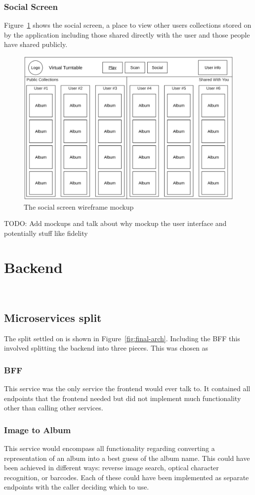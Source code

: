 \subsubsection{Social Screen}
Figure~\ref{fig:social_screen_mockup} shows the social screen, a place to view other users collections stored on by the application including those shared directly with the user and those people have shared publicly.
\begin{figure} [H]
    \centering
    \includegraphics[width=0.6\linewidth]{figures/social_screen_mockup.png}
    \caption{The social screen wireframe mockup}
    \label{fig:social_screen_mockup}
\end{figure}

TODO: Add mockups and talk about why mockup the user interface and potentially stuff like fidelity

\section{Backend}~\label{sec:backend-design}
\subsection{Microservices split}
The split settled on is shown in Figure~\ref{fig:final-arch}. Including the BFF this involved splitting the backend into three pieces. This was chosen as

\subsubsection{BFF}
This service was the only service the frontend would ever talk to. It contained all endpoints that the frontend needed but did not implement much functionality other than calling other services.
\subsubsection{Image to Album}
This service would encompass all functionality regarding converting a representation of an album into a best guess of the album name. This could have been achieved in different ways: reverse image search, optical character recognition, or barcodes. Each of these could have been implemented as separate endpoints with the caller deciding which to use.

